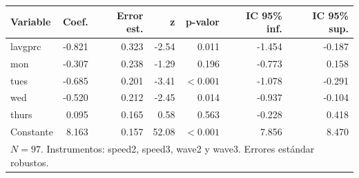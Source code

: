
\begin{tabular}{lrrrrrr}
\toprule
Variable & Coef. & Error est. & z & p-valor & IC 95\% inf. & IC 95\% sup.\\
\midrule
lavgprc & -0.821 & 0.323 & -2.54 & 0.011 & -1.454 & -0.187\\
mon & -0.307 & 0.238 & -1.29 & 0.196 & -0.773 & 0.158\\
tues & -0.685 & 0.201 & -3.41 & $<0.001$ & -1.078 & -0.291\\
wed & -0.520 & 0.212 & -2.45 & 0.014 & -0.937 & -0.104\\
thurs & 0.095 & 0.165 & 0.58 & 0.563 & -0.228 & 0.418\\
Constante & 8.163 & 0.157 & 52.08 & $<0.001$ & 7.856 & 8.470\\
\midrule
\multicolumn{7}{l}{$N=97$. Instrumentos: speed2, speed3, wave2 y wave3. Errores estándar robustos.}\\
\bottomrule
\end{tabular}
